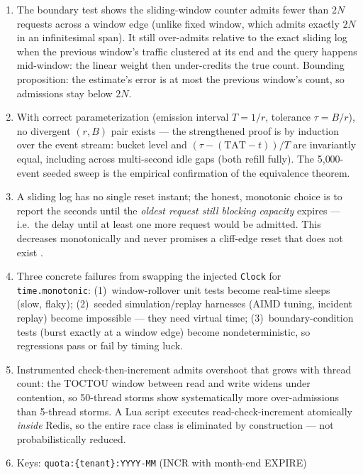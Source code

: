 \begin{enumerate}[label=\textbf{E14.\arabic*.}, leftmargin=2.8em]
  \item The boundary test shows the sliding-window counter admits fewer than
    $2N$ requests across a window edge (unlike fixed window, which admits
    exactly $2N$ in an infinitesimal span). It still over-admits relative to
    the exact sliding log when the previous window's traffic clustered at
    its end and the query happens mid-window: the linear weight then
    under-credits the true count. Bounding proposition: the estimate's error
    is at most the previous window's count, so admissions stay below $2N$.
  \item With correct parameterization (emission interval $T = 1/r$,
    tolerance $\tau = B/r$), no divergent $(r, B)$ pair exists --- the
    strengthened proof is by induction over the event stream: bucket level
    and $(\tau - (\mathrm{TAT} - t))/T$ are invariantly equal, including
    across multi-second idle gaps (both refill fully). The 5{,}000-event
    seeded sweep is the empirical confirmation of the equivalence theorem.
  \item A sliding log has no single reset instant; the honest, monotonic
    choice is to report the seconds until the \emph{oldest request still
    blocking capacity} expires --- i.e.\ the delay until at least one more
    request would be admitted. This decreases monotonically and never
    promises a cliff-edge reset that does not exist
    \cite{ietf_ratelimit_headers}.
  \item Three concrete failures from swapping the injected \texttt{Clock}
    for \texttt{time.monotonic}: (1)~window-rollover unit tests become
    real-time sleeps (slow, flaky); (2)~seeded simulation/replay harnesses
    (AIMD tuning, incident replay) become impossible --- they need virtual
    time; (3)~boundary-condition tests (burst exactly at a window edge)
    become nondeterministic, so regressions pass or fail by timing luck.
  \item Instrumented check-then-increment admits overshoot that grows with
    thread count: the TOCTOU window between read and write widens under
    contention, so 50-thread storms show systematically more over-admissions
    than 5-thread storms. A Lua script executes read-check-increment
    atomically \emph{inside} Redis, so the entire race class is eliminated
    by construction --- not probabilistically reduced.
  \item Keys: \texttt{quota:\{tenant\}:YYYY-MM} (INCR with month-end EXPIRE)

\end{enumerate}

